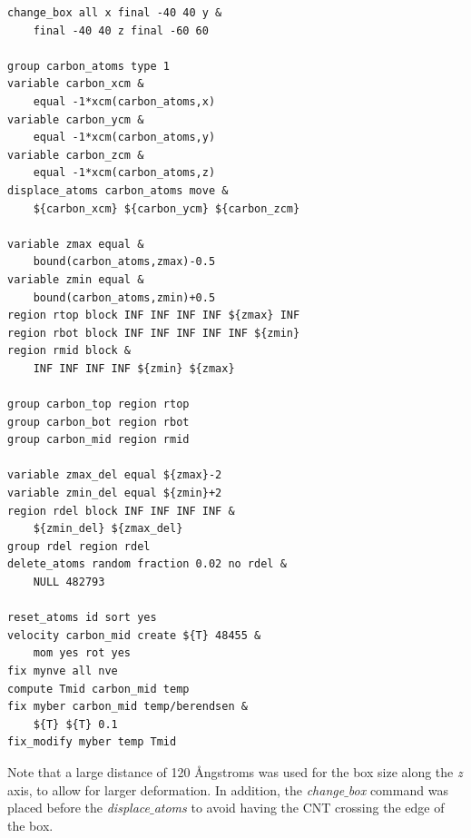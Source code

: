 \documentclass[9pt,tutorial]{livecoms}
\begin{document}
{\normalsize \begin{verbatim}
change_box all x final -40 40 y &
    final -40 40 z final -60 60

group carbon_atoms type 1
variable carbon_xcm &
    equal -1*xcm(carbon_atoms,x)
variable carbon_ycm &
    equal -1*xcm(carbon_atoms,y)
variable carbon_zcm &
    equal -1*xcm(carbon_atoms,z)
displace_atoms carbon_atoms move &
    ${carbon_xcm} ${carbon_ycm} ${carbon_zcm}

variable zmax equal &
    bound(carbon_atoms,zmax)-0.5
variable zmin equal &
    bound(carbon_atoms,zmin)+0.5
region rtop block INF INF INF INF ${zmax} INF
region rbot block INF INF INF INF INF ${zmin}
region rmid block &
    INF INF INF INF ${zmin} ${zmax}

group carbon_top region rtop
group carbon_bot region rbot
group carbon_mid region rmid

variable zmax_del equal ${zmax}-2
variable zmin_del equal ${zmin}+2
region rdel block INF INF INF INF &
    ${zmin_del} ${zmax_del}
group rdel region rdel
delete_atoms random fraction 0.02 no rdel &
    NULL 482793

reset_atoms id sort yes
velocity carbon_mid create ${T} 48455 &
    mom yes rot yes
fix mynve all nve
compute Tmid carbon_mid temp
fix myber carbon_mid temp/berendsen &
    ${T} ${T} 0.1
fix_modify myber temp Tmid
\end{verbatim}}
Note that a large distance of 120 Ångstroms was used for the box size along the \textit{z} axis, to allow for larger deformation. In addition, the \textit{change$\_$box} command was placed before the \textit{displace$\_$atoms} to avoid having the CNT crossing the edge of the box.
\end{document}
